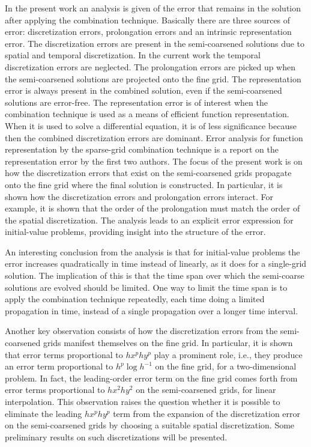 \documentclass[11pt]{article}
\begin{document}
In the present work an analysis is given of the error that remains in the
solution after applying the combination technique. Basically there are three
sources of error: discretization errors, prolongation errors and an
intrinsic representation error. The discretization errors are present in the
semi-coarsened solutions due to spatial and temporal discretization. In the
current work the temporal discretization errors are neglected.
The prolongation errors are picked up when the semi-coarsened solutions are
projected onto the fine grid. The representation error is always present in
the combined solution, even if the semi-coarsened solutions are error-free.
The representation error is of interest when the combination technique is
used as a means of efficient function representation. When it is used to
solve a differential equation, it is of less significance because then the
combined discretization errors are dominant.
Error analysis for
function representation by the sparse-grid combination technique is a
report on the representation error by the first two authors.
The focus of the present
work is on how the discretization errors that exist on the semi-coarsened
grids propagate onto the fine grid where the final solution is constructed.
In particular, it is shown how the discretization errors and prolongation
errors interact. For example, it is shown that the order of the prolongation
must
match the order of the spatial discretization. The analysis leads to an
explicit error expression for initial-value problems, providing insight into
the structure of the error.

An interesting conclusion from the analysis is that for initial-value
problems the error increases quadratically in time instead of linearly, as it
does for a single-grid solution. The implication of this is that the time
span over which the semi-coarse solutions are evolved should be limited. One
way to limit the time span is to apply the combination technique repeatedly,
each time doing a limited propagation in time, instead of a single
propagation over a longer time interval.

Another key observation consists of how the discretization errors from the
semi-coarsened grids manifest themselves on the fine grid. In particular, it
is shown that error terms proportional to
$hx^p hy^p$
play a prominent role,
i.e., they produce an error term proportional to
$h^p \log h^{-1}$ on the fine grid,
for a two-dimensional problem. In fact, the leading-order error term on the
fine grid comes forth from error terms proportional to
$hx^2 hy^2$ on the semi-coarsened grids,
for linear interpolation. This observation raises the question
whether it is possible to eliminate the leading
$hx^p hy^p$
term from the
expansion of the discretization error on the semi-coarsened grids by
choosing a suitable spatial discretization. Some preliminary results on such
discretizations will be presented.
\end{document}
